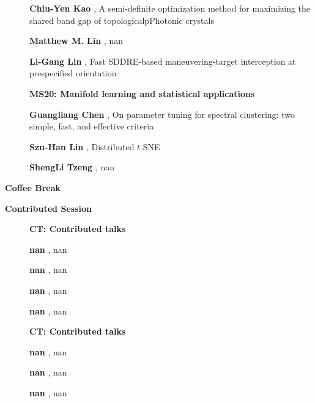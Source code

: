 \documentclass[ILAS2025-program.tex]{subfiles}
\begin{document}
\begin{description}
\begin{description}
    \item[] \textbf{Chiu-Yen Kao} , A semi-definite optimization method for maximizing the shared band gap of topologicalpPhotonic crystals
        \item[] \textbf{Matthew M. Lin} , nan
        \item[] \textbf{Li-Gang Lin} , Fast SDDRE-based maneuvering-target interception at prespecified orientation
        \end{description}
    \begin{description}
    \item[] {\color{mstitle}\textbf{MS20: Manifold learning and statistical applications}} 
    \item[] \textbf{Guangliang Chen} , On parameter tuning for spectral clustering: two simple, fast, and effective criteria
        \item[] \textbf{Szu-Han Lin} , Distributed $t$-SNE
        \item[] \textbf{ShengLi Tzeng} , nan
        \end{description}
    \item[\info{15:30\textrm{--}16:00}] \textbf{Coffee Break} 
    \item[\info{16:00\textrm{--}18:00}] \textbf{Contributed Session} 
    \begin{description}
    \item[] {\color{mstitle}\textbf{CT: Contributed talks}} 
    \item[] \textbf{nan} , nan
        \item[] \textbf{nan} , nan
        \item[] \textbf{nan} , nan
        \item[] \textbf{nan} , nan
        \end{description}
    \begin{description}
    \item[] {\color{mstitle}\textbf{CT: Contributed talks}} 
    \item[] \textbf{nan} , nan
        \item[] \textbf{nan} , nan
        \item[] \textbf{nan} , nan

\end{description}
\end{description}
\end{document}
